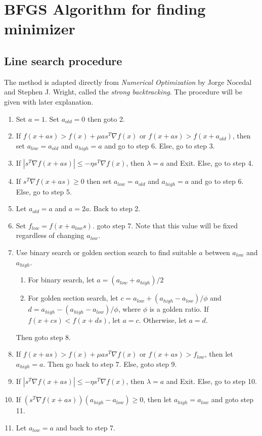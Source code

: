 \documentclass{article}
\begin{document}
\section*{BFGS Algorithm for finding minimizer}

\subsection*{Line search procedure}

The method is adapted directly from \emph{Numerical Optimization} by Jorge Nocedal and Stephen J. Wright, called the \emph{strong backtracking}. The procedure will be given with later explanation.
\begin{enumerate}
    \item Set $a = 1$. Set $a_{old} = 0$ then goto 2.
    \item If $f(x + as) > f(x) + \mu a s^T \nabla f(x)$ or $f(x + a s) > f(x + a_{old})$, then set $a_{low} = a_{old}$ and $a_{high} = a$ and go to step 6. Else, go to step 3.
    \item If $|s^T \nabla f(x + as)| \leq -\eta s^T \nabla f(x)$, then $\lambda = a$ and Exit. Else, go to step 4.
    \item If $s^T \nabla f(x + as) \geq 0$ then set $a_{low} = a_{old}$ and $a_{high} = a$ and go to step 6. Else, go to step 5.
    \item Let $a_{old} = a$ and $a = 2a$. Back to step 2.
    \item Set $f_{low} = f(x + a_{low}s)$. goto step 7. Note that this value will be fixed regardless of changing $a_{low}$.
    \item Use binary search or golden section search to find suitable $a$ between $a_{low}$ and $a_{high}$.
    \begin{enumerate}
        \item For binary search, let $a = (a_{low} + a_{high})/2$
        \item For golden section search, let $c = a_{low} + (a_{high} - a_{low})/\phi$ and $d = a_{high} - (a_{high} - a_{low})/\phi$, where $\phi$ is a golden ratio. If $f(x + cs) < f(x + ds)$, let $a = c$. Otherwise, let $a = d$.
    \end{enumerate}
    Then goto step 8.
    \item If $f(x + as) > f(x) + \mu a s^T \nabla f(x)$ or $f(x + a s) > f_{low}$, then let $a_{high} = a$. Then go back to step 7. Else, goto step 9.
    \item If $|s^T \nabla f(x + as)| \leq -\eta s^T \nabla f(x)$, then $\lambda = a$ and Exit. Else, go to step 10.
    \item If $(s^T \nabla f(x + as))(a_{high} - a_{low}) \geq 0$, then let $a_{high} = a_{low}$ and goto step 11.
    \item Let $a_{low} = a$ and back to step 7.
\end{enumerate}
\end{document}
